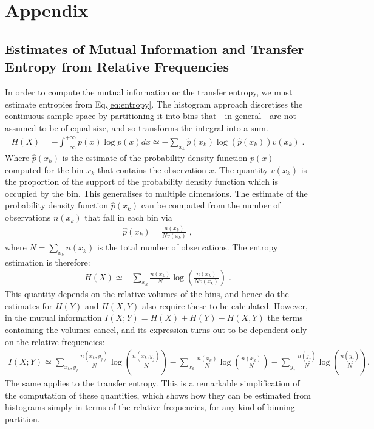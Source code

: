 \documentclass[]{rsos}%
\begin{document}


\section{Appendix}

 \subsection{Estimates of Mutual Information and Transfer Entropy from Relative Frequencies}
 In order to compute the mutual information or the transfer entropy, we must estimate entropies from Eq.\ref{eq:entropy}.
 The histogram approach discretises the continuous sample space by partitioning it into bins that - in general - are not assumed to be of equal size, and so transforms the integral into a sum.
  \begin{eqnarray}
    \label{eq:entropyDiscrere}
    H(X) = - \int_{-\infty}^{+\infty}  {  p(x) \log{  p(x)}  } dx \simeq - \sum_{x_k}  \hat p(x_k) \log\left({ \hat p(x_k)}\right) v(x_k)\;.
  \end{eqnarray}
Where $\hat p(x_k)$ is the estimate of the probability density function $p(x)$ computed for the bin $x_k$ that contains the observation $x$.
The quantity $v(x_k)$ is the proportion of the support of the probability density function which is occupied by the bin. This generalises to multiple dimensions.
The estimate of the probability density function $\hat p(x_k)$ can be computed from the number of observations $n(x_k)$ that fall in each bin via
    \begin{eqnarray}
    \label{eq:pdfDiscrere}
 \hat p(x_k) = \frac{n(x_k)}{N v(x_k)}\;,
  \end{eqnarray}
where $N=\sum_{x_k} n(x_k)$ is the total number of observations. 
The entropy estimation is therefore:
  \begin{eqnarray}
    \label{eq:entropyDiscrere1}
    H(X) \simeq - \sum_{x_k}   \frac{n(x_k)}{N } \log\left({  \frac{n(x_k)}{N v(x_k)} }\right) \;.
  \end{eqnarray}
This quantity depends on the relative volumes of the bins, and hence do the estimates for $H(Y)$ and $H(X,Y)$ also require these to be calculated. However, in the mutual information $I(X;Y) = H(X)+H(Y)-H(X,Y)$ the terms containing the volumes cancel, and its expression turns out to be dependent only on the relative frequencies:
  \begin{eqnarray}
    \label{eq:mutualnfoDiscrere}
  I(X;Y) \! \simeq \!
 \! \!\sum_{x_k,y_j} \!\!\frac{n(x_k,y_j)}{N } \log\left({  \frac{n(x_k,y_j)}{N} }\right)
   -\! \sum_{x_k}      \! \frac{n(x_k)}{N } \log\left({  \frac{n(x_k)}{N} }\right) 
  - \!\sum_{y_j}        \!\frac{n(j_j)}{N } \log\left({  \frac{n(y_j)}{N} }\right) .
  \end{eqnarray}
  The same applies to the transfer entropy. 
  This is a remarkable simplification of the computation of these quantities, which shows how they can be estimated from histograms simply in terms of the relative frequencies, for any kind of binning partition.
 
\end{document}
